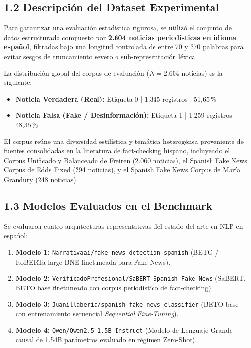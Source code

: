 \subsection*{1.2 Descripción del Dataset Experimental}

Para garantizar una evaluación estadística rigurosa, se utilizó el conjunto de datos estructurado compuesto por \textbf{2.604 noticias periodísticas en idioma español}, filtradas bajo una longitud controlada de entre 70 y 370 palabras para evitar sesgos de truncamiento severo o sub-representación léxica.

La distribución global del corpus de evaluación ($N = 2.604$ noticias) es la siguiente:
\begin{itemize}
    \item \textbf{Noticia Verdadera (Real):} Etiqueta 0 | 1.345 registros | 51,65\,\%
    \item \textbf{Noticia Falsa (Fake / Desinformación):} Etiqueta 1 | 1.259 registros | 48,35\,\%
\end{itemize}

El corpus reúne una diversidad estilística y temática heterogénea proveniente de fuentes consolidadas en la literatura de fact-checking hispano, incluyendo el Corpus Unificado y Balanceado de Freiren (2.060 noticias), el Spanish Fake News Corpus de Edds Fixed (294 noticias), y el Spanish Fake News Corpus de María Grandury (248 noticias).

\subsection*{1.3 Modelos Evaluados en el Benchmark}

Se evaluaron cuatro arquitecturas representativas del estado del arte en NLP en español:
\begin{enumerate}
    \item \textbf{Modelo 1:} \texttt{Narrativaai/fake-news-detection-spanish} (BETO / RoBERTa-large BNE finetuneada para Fake News).
    \item \textbf{Modelo 2:} \texttt{VerificadoProfesional/SaBERT-Spanish-Fake-News} (SaBERT, BETO base finetuneado con corpus periodístico de fact-checking).
    \item \textbf{Modelo 3:} \texttt{Juanillaberia/spanish-fake-news-classifier} (BETO base con entrenamiento secuencial \textit{Sequential Fine-Tuning}).
    \item \textbf{Modelo 4:} \texttt{Qwen/Qwen2.5-1.5B-Instruct} (Modelo de Lenguaje Grande causal de 1.54B parámetros evaluado en régimen Zero-Shot).
\end{enumerate}

